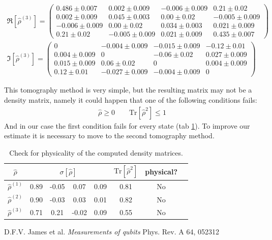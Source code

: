 \documentclass[a4paper, 11pt]{article}
\begin{document}
\begin{gather*}
        \\
        \Re[\hat{\rho}^{(3)}] =
        \begin{pmatrix}
          0.486 \pm 0.007 & 0.002 \pm 0.009 & -0.006 \pm 0.009 & 0.21 \pm 0.02 \\
          0.002 \pm 0.009 & 0.045 \pm 0.003 & 0.00 \pm 0.02 & -0.005 \pm 0.009 \\
          -0.006 \pm 0.009 & 0.00 \pm 0.02 & 0.034 \pm 0.003 & 0.021 \pm 0.009 \\
          0.21 \pm 0.02 & -0.005 \pm 0.009 & 0.021 \pm 0.009 & 0.435 \pm 0.007
        \end{pmatrix}
        \\
        \Im[\hat{\rho}^{(3)}] =
        \begin{pmatrix}
          0 & -0.004 \pm 0.009 & -0.015 \pm 0.009 & -0.12 \pm 0.01 \\
          0.004 \pm 0.009 & 0 & -0.06 \pm 0.02 & 0.027 \pm 0.009 \\
          0.015 \pm 0.009 & 0.06 \pm 0.02 & 0 & 0.004 \pm 0.009 \\
          0.12 \pm 0.01 & -0.027 \pm 0.009 & -0.004 \pm 0.009 & 0
        \end{pmatrix}
      \end{gather*}

      This tomography method is very simple, but the resulting matrix may not be a density matrix, namely it could happen that one of the following conditions fails:
      \begin{gather*}
        \hat{\rho} \ge 0 \qquad \text{Tr}[\hat{\rho}^2] \le 1
      \end{gather*}
      And in our case the first condition fails for every state (tab \ref{tab:tomo_phys}). To improve our estimate it is necessary to move to the second tomography method.

      \begin{table}[H]
        \centering
        \begin{tabular}{cccccccc}
          \toprule
          $\hat{\rho}$ & \multicolumn{4}{c}{$\sigma[\hat{\rho}]$} & $\text{Tr}[\hat{\rho}^2]$ & physical? \\
          \midrule
          $\hat{\rho}^{(1)}$ & 0.89 & -0.05 & 0.07 & 0.09 & 0.81 & No \\
          $\hat{\rho}^{(2)}$ & 0.90 & -0.03 & 0.03 & 0.01 & 0.82 & No \\
          $\hat{\rho}^{(3)}$ & 0.71 & 0.21 & -0.02 & 0.09 & 0.55 & No \\
          \bottomrule
        \end{tabular}
        \caption{Check for physicality of the computed density matrices.}
        \label{tab:tomo_phys}
      \end{table}












  \begin{thebibliography}{100}
     D.F.V. James et al. \emph{Measurements of qubits} Phys. Rev. A 64, 052312
  \end{thebibliography}
\end{document}
